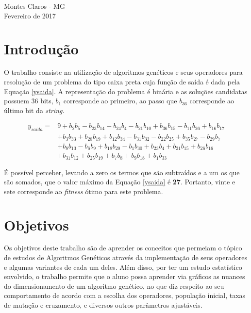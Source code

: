 \documentclass[11pt,a4paper]{article}
\begin{document}
\thispagestyle{empty}
\vspace*{\fill}
\begin{center}
Montes Claros - MG\\
Fevereiro de 2017
\end{center}
\newpage


\section{Introdução}
O trabalho consiste na utilização de algoritmos genéticos e seus operadores para resolução de um problema do tipo caixa preta cuja função de saída é dada pela Equação \ref{ysaida}. A representação do problema é binária e as soluções candidatas possuem 36 bits, $b_{1}$ corresponde ao primeiro, ao passo que $b_{36}$ corresponde ao último bit da \textit{string}.

\begin{equation}
\begin{array}{rl}
y_{saida}=&9+b_{2}b_{5}-b_{23}b_{14}+b_{24}b_{4}-b_{21}b_{10}+b_{36}b_{15}-b_{11}b_{26}+b_{16}b_{17}\\
&+b_{3}b_{33}+b_{28}b_{19}+b_{12}b_{34}-b_{31}b_{32}-b_{22}b_{25}+b_{35}b_{27}-b_{29}b_{7}\\
&+b_{8}b_{13}-b_{6}b_{9}+b_{18}b_{20}-b_{1}b_{30}+b_{23}b_{4}+b_{21}b_{15}+b_{26}b_{16}\\
&+b_{31}b_{12}+b_{25}b_{19}+b_{7}b_{8}+b_{9}b_{18}+b_{1}b_{33}
\end{array}
\label{ysaida}
\end{equation}

É possível perceber, levando a zero os termos que são subtraídos e a um os que são somados, que o valor máximo da Equação \ref{ysaida} é \textbf{27}. Portanto, vinte e sete corresponde ao \textit{fitness} ótimo para este problema.

\section{Objetivos}
Os objetivos deste trabalho são de aprender os conceitos que permeiam o tópico de estudos de Algoritmos Genéticos através da implementação de seus operadores e algumas variantes de cada um deles. Além disso, por ter um estudo estatístico envolvido, o trabalho permite que o aluno possa aprender via gráficos as nuances do dimensionamento de um algoritmo genético, no que diz respeito ao seu comportamento de acordo com a escolha dos operadores, população inicial, taxas de mutação e cruzamento, e diversos outros parâmetros ajustáveis.
\end{document}
